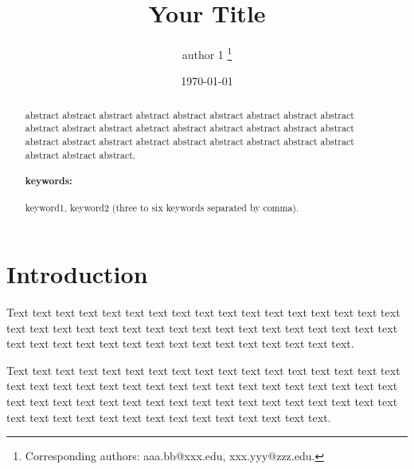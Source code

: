 \documentclass{ejasa}
\title{Your Title}
\author[a]{author 1%
     \thanks{Corresponding authors: %
     aaa.bb@xxx.edu, xxx.yyy@zzz.edu.}}
\affil[a]{University and department\\
Address}
\date{{\small \today }}
\newcommand{\ejasafirstpage}{1}
\begin{document}



%



 \maketitle 
\setcounter{page}{\ejasafirstpage}

\thispagestyle{firstpage}


\begin{abstract}
%
abstract abstract abstract abstract abstract abstract abstract abstract abstract abstract abstract abstract abstract abstract abstract abstract abstract abstract abstract abstract abstract abstract abstract abstract abstract abstract abstract abstract abstract abstract.
%
\paragraph{keywords:} keyword1, keyword2 (three to six keywords separated by comma).
\end{abstract}

\section{Introduction}

Text text text text text text text text text text text text text text text text text text text text text text text text text text text text text text text text text text text text text text text text text text text text text text text text text.

Text text text text text text text text text text text text text text text text text text text text text text text text text text text text text text text text text text text text text text text text text text text text text text text text text text text text text text text text text text text text text text text text text.
\end{document}
